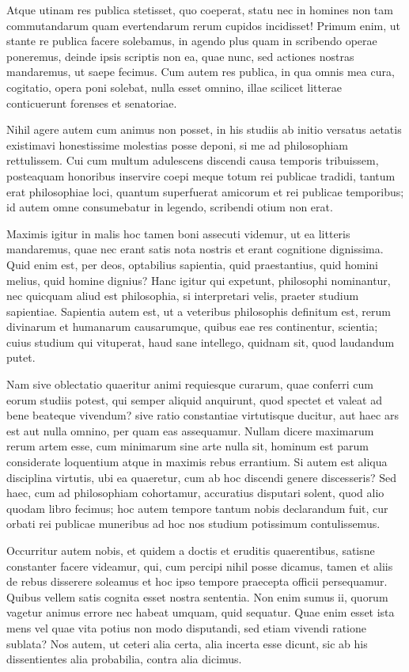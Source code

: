  Atque utinam res publica stetisset, quo coeperat, statu nec in homines non tam commutandarum quam evertendarum rerum cupidos incidisset! Primum enim, ut stante re publica facere solebamus, in agendo plus quam in scribendo operae poneremus, deinde ipsis scriptis non ea, quae nunc, sed actiones nostras mandaremus, ut saepe fecimus. Cum autem res publica, in qua omnis mea cura, cogitatio, opera poni solebat, nulla esset omnino, illae scilicet litterae conticuerunt forenses et senatoriae.

 Nihil agere autem cum animus non posset, in his studiis ab initio versatus aetatis existimavi honestissime molestias posse deponi, si me ad philosophiam rettulissem. Cui cum multum adulescens discendi causa temporis tribuissem, posteaquam honoribus inservire coepi meque totum rei publicae tradidi, tantum erat philosophiae loci, quantum superfuerat amicorum et rei publicae temporibus; id autem omne consumebatur in legendo, scribendi otium non erat.

 Maximis igitur in malis hoc tamen boni assecuti videmur, ut ea litteris mandaremus, quae nec erant satis nota nostris et erant cognitione dignissima. Quid enim est, per deos, optabilius sapientia, quid praestantius, quid homini melius, quid homine dignius? Hanc igitur qui expetunt, philosophi nominantur, nec quicquam aliud est philosophia, si interpretari velis, praeter studium sapientiae. Sapientia autem est, ut a veteribus philosophis definitum est, rerum divinarum et humanarum causarumque, quibus eae res continentur, scientia; cuius studium qui vituperat, haud sane intellego, quidnam sit, quod laudandum putet.

 Nam sive oblectatio quaeritur animi requiesque curarum, quae conferri cum eorum studiis potest, qui semper aliquid anquirunt, quod spectet et valeat ad bene beateque vivendum? sive ratio constantiae virtutisque ducitur, aut haec ars est aut nulla omnino, per quam eas assequamur. Nullam dicere maximarum rerum artem esse, cum minimarum sine arte nulla sit, hominum est parum considerate loquentium atque in maximis rebus errantium. Si autem est aliqua disciplina virtutis, ubi ea quaeretur, cum ab hoc discendi genere discesseris? Sed haec, cum ad philosophiam cohortamur, accuratius disputari solent, quod alio quodam libro fecimus; hoc autem tempore tantum nobis declarandum fuit, cur orbati rei publicae muneribus ad hoc nos studium potissimum contulissemus.

 Occurritur autem nobis, et quidem a doctis et eruditis quaerentibus, satisne constanter facere videamur, qui, cum percipi nihil posse dicamus, tamen et aliis de rebus disserere soleamus et hoc ipso tempore praecepta officii persequamur. Quibus vellem satis cognita esset nostra sententia. Non enim sumus ii, quorum vagetur animus errore nec habeat umquam, quid sequatur. Quae enim esset ista mens vel quae vita potius non modo disputandi, sed etiam vivendi ratione sublata? Nos autem, ut ceteri alia certa, alia incerta esse dicunt, sic ab his dissentientes alia probabilia, contra alia dicimus.

